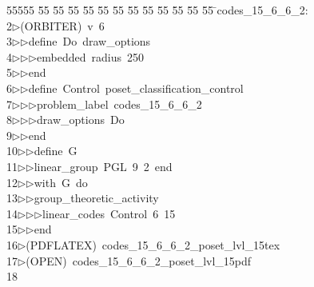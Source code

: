 %
%
\begin{tabbing}
55555 \= 55 \= 55 \= 55 \= 55 \= 55 \= 55 \= 55 \= 55 \= 55 \= 55 \= 55 \= 55 \= \>codes\_15\_6\_6\_2:\\[0pt]
2\>$\triangleright$\>(ORBITER)\ v\ 6\ \\[0pt]
3\>$\triangleright$\>$\triangleright$\>define\ Do\ draw\_options\ \\[0pt]
4\>$\triangleright$\>$\triangleright$\>$\triangleright$\>embedded\ radius\ 250\ \\[0pt]
5\>$\triangleright$\>$\triangleright$\>end\ \\[0pt]
6\>$\triangleright$\>$\triangleright$\>define\ Control\ poset\_classification\_control\ \\[0pt]
7\>$\triangleright$\>$\triangleright$\>$\triangleright$\>problem\_label\ codes\_15\_6\_6\_2\ \\[0pt]
8\>$\triangleright$\>$\triangleright$\>$\triangleright$\>draw\_options\ Do\ \\[0pt]
9\>$\triangleright$\>$\triangleright$\>end\ \\[0pt]
10\>$\triangleright$\>$\triangleright$\>define\ G\ \\[0pt]
11\>$\triangleright$\>$\triangleright$\>linear\_group\ PGL\ 9\ 2\ end\ \\[0pt]
12\>$\triangleright$\>$\triangleright$\>with\ G\ do\ \\[0pt]
13\>$\triangleright$\>$\triangleright$\>group\_theoretic\_activity\ \\[0pt]
14\>$\triangleright$\>$\triangleright$\>$\triangleright$\>linear\_codes\ Control\ 6\ 15\ \\[0pt]
15\>$\triangleright$\>$\triangleright$\>end\\[0pt]
16\>$\triangleright$\>(PDFLATEX)\ codes\_15\_6\_6\_2\_poset\_lvl\_15tex\\[0pt]
17\>$\triangleright$\>(OPEN)\ codes\_15\_6\_6\_2\_poset\_lvl\_15pdf\ \\[0pt]
18\>\end{tabbing}
